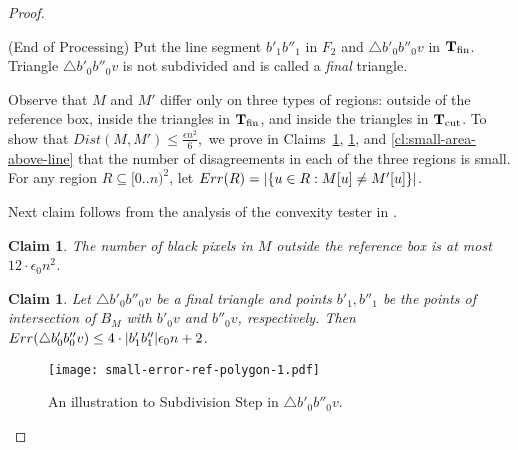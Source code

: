 \documentclass[11pt,english]{article}
\renewenvironment{enumerate}[1]{\begin{compactenum}#1}{\end{compactenum}}
\newtheorem{claim}[theorem]{Claim}
\numberwithin{figure}{section}
\newcommand{\Dis}{Dist}
\newcommand{\integerset}[1]{[0..{#1})}
\newcommand{\domain}{\integerset{n}^2}
\newcommand{\Tfin}{{\bf T}_{\text{fin}}}
\newcommand{\Tcut}{{\bf T}_{\text{cut}}}
\newcommand{\mydelta}{\epsilon} \newcommand{\bigdelta}{{\epsilon_0}} \newcommand{\dsquares}{d_{\rm squares}}
\newcommand{\mch}[1]{{\color{black}#1}}
\begin{document}
\begin{proof}
\begin{enumerate}
\item {\sf (End of Processing)} Put the line segment $b'_1b''_1$ in $F_2$ and $\bigtriangleup b'_0b''_0v$ in $\Tfin$. Triangle $\bigtriangleup b'_0b''_0v$ is not subdivided and is called a {\em final} triangle.
\end{enumerate}



Observe that $M$ and $M'$ differ only on three types of regions: outside of the reference box, inside the triangles in $\Tfin$, and inside the triangles in $\Tcut$. To show that $\Dis(M,M')\leq\frac{\mydelta n^2}{6},$ we prove in Claims~\ref{cl:error-in-strips}, \ref{cl:error-in-triangles}, and \ref{cl:small-area-above-line} that the number of disagreements in each of the three regions is small.
For any region $R\subseteq\domain$, let $Err(R)=|\{u\in R : M[u]\neq M'[u]\}|$.


Next claim
follows from the analysis of the convexity tester in \cite{Ras03}.
\begin{claim}
\label{cl:error-in-strips}
The number of black pixels in $M$
outside the reference box is at most $12\cdot\bigdelta n^2$.
\end{claim}
\mch{

\begin{claim}\label{cl:error-in-triangles}
Let $\bigtriangleup b'_0b''_0v$ be a final triangle and points $b'_1,b''_1$ be the points of intersection of $B_M$ with $b'_0v$ and $b''_0v$, respectively. Then $\myerr{\bigtriangleup b'_0b''_0v}\leq 4\cdot|b'_1b''_1|\bigdelta n+2$.
\end{claim}


\begin{figure}[ht]
\centering
\texttt{[image: small-error-ref-polygon-1.pdf]}
\caption{ An illustration to Subdivision Step in $\bigtriangleup b'_0b''_0v$.}
\label{fig:small-error-ref-poly-1}
\end{figure}


}
\end{proof}
\end{document}
